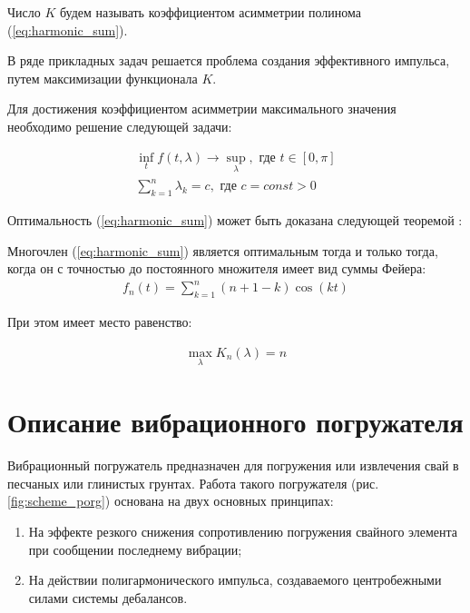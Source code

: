 Число $K$ будем называть коэффициентом асимметрии полинома (\ref{eq:harmonic_sum}).

В ряде прикладных задач решается проблема создания эффективного импульса, путем максимизации функционала $K$.

Для достижения коэффициентом асимметрии максимального значения необходимо решение следующей задачи:

\begin{equation}\label{eq:math_task}
    \begin{gathered}
        \inf_t f(t, \lambda) \rightarrow \sup_\lambda, \textrm{ где } t \in [0, \pi]\\
        \sum\limits_{k = 1}^n \lambda_k = c, \textrm{ где } c = const > 0
    \end{gathered}
\end{equation}

Оптимальность (\ref{eq:harmonic_sum}) может быть доказана следующей теоремой \cite{kostin_article}:

\begin{theorem}\label{th:mf}
    Многочлен (\ref{eq:harmonic_sum}) является оптимальным тогда и только
    тогда, когда он с точностью до постоянного множителя имеет вид суммы Фейера:
    \begin{equation}\label{eq:feer}
        \begin{gathered}
            f_n(t) = \sum\limits_{k = 1}^n (n + 1 - k) \cos(kt)
        \end{gathered}
    \end{equation}
    
    При этом имеет место равенство:
    
    \begin{equation}\label{eq:max_lambda}
        \begin{gathered}
            \max \limits_{\lambda} K_n(\lambda) = n
        \end{gathered}
    \end{equation}
\end{theorem}

\clearpage
\section{Описание вибрационного погружателя}
\label{chapter:pogr}

Вибрационный погружатель предназначен для погружения или извлечения свай в песчаных или глинистых грунтах.
Работа такого погружателя (рис. \ref{fig:scheme_porg}) основана на двух основных принципах:
\begin{enumerate} 
    \item На эффекте резкого снижения сопротивлению погружения свайного элемента при сообщении последнему вибрации;
    \item На действии полигармонического импульса, создаваемого центробежными силами системы дебалансов.
\end{enumerate}

